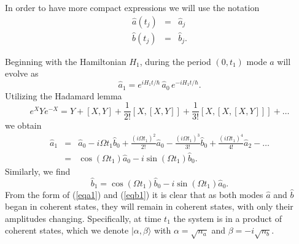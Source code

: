 \documentclass{iopart}
\begin{document}
In order to have more compact expressions we will use the notation
\begin{eqnarray}
\hat{a}(t_j) &=& \hat{a}_j \\
\hat{b}(t_j) &=& \hat{b}_j.
\end{eqnarray}

Beginning with the Hamiltonian $H_1$, during the period $(0, t_1)$ mode $\hat{a}$ will evolve as
\begin{equation}
\hat{a}_1 = e^{ i H_1 t/ \hbar} \, \hat{a}_0 \, e^{-i H_1 t/ \hbar}.
\end{equation}
Utilizing the Hadamard lemma
\begin{equation}
e^X Y e^{-X} = Y + [X,Y] + \frac{1}{2!}[X,[X,Y]] + \frac{1}{3!}[X,[X,[X,Y]]] + \ldots
\label{eqHadamard}
\end{equation}
we obtain 
\begin{eqnarray}
\hat{a}_1 &=& \hat{a}_0 - i \Omega t_1 \hat{b}_0 + \frac{(i \Omega t_1)^2}{2!} \hat{a}_0 - \frac{(i \Omega t_1)^3}{3!} \hat{b}_0 + \frac{(i \Omega t_1)^4}{4!} \hat{a}_2 - \ldots \nonumber \\
          &=& \cos (\Omega t_1) \hat{a}_0 -i \sin (\Omega t_1) \hat{b}_0.
\label{eqa1}
\end{eqnarray}
Similarly, we find
\begin{equation}
\hat{b}_1 = \cos (\Omega t_1) \hat{b}_0 - i \sin (\Omega t_1) \hat{a}_0.
\label{eqb1}
\end{equation}
From the form of (\ref{eqa1}) and (\ref{eqb1}) it is clear that as both modes $\hat{a}$ and $\hat{b}$ began in coherent states, they will remain in coherent states, with only their amplitudes changing. Specifically, at time $t_1$ the system is in a product of coherent states, which we denote $|\alpha, \beta\rangle$ with $\alpha=\sqrt{n_a}$ and $\beta=-i\sqrt{n_b}$.
\end{document}
